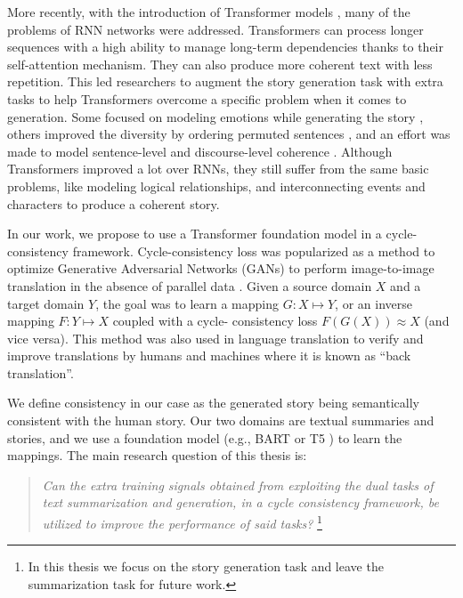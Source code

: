 More recently, with the introduction of Transformer models \citep{vaswani2017attention}, many of the problems of RNN networks were addressed. Transformers can process longer sequences with a high ability to manage long-term dependencies thanks to their self-attention mechanism. They can also produce more coherent text with less repetition. This led researchers to augment the story generation task with extra tasks to help Transformers overcome a specific problem when it comes to generation. Some focused on modeling emotions while generating the story \citep{brahman2020modeling, kong2021stylized}, others improved the diversity by ordering permuted sentences \citep{yu2021sentence}, and an effort was made to model sentence-level and discourse-level coherence \citep{guan2021long}. Although Transformers improved a lot over RNNs, they still suffer from the same basic problems, like modeling logical relationships, and interconnecting events and characters to produce a coherent story.

In our work, we propose to use a Transformer foundation model \citep{bommasani2021opportunities} in a cycle-consistency framework. Cycle-consistency loss was popularized as a method to optimize Generative Adversarial Networks (GANs) to perform image-to-image translation in the absence of parallel data \citep{zhu2017unpaired}. Given a source domain $X$ and a target domain $Y$, the goal was to learn a mapping $G \colon X \mapsto Y$, or an inverse mapping $F \colon Y \mapsto X$ coupled with a cycle-	consistency loss $F(G(X)) \approx X$ (and vice versa). This method was also used in language translation to verify and improve translations by humans \citep{brislin1970back} and machines \citep{he2016dual} where it is known as ``back translation''.

We define consistency in our case as the generated story being semantically consistent with the human story. Our two domains are textual summaries and stories, and we use a foundation model (e.g., BART \citep{lewis2019bart} or T5 \citep{raffel2019exploring}) to learn the mappings. The main research question of this thesis is:

\begin{quote}
\textit{Can the extra training signals obtained from exploiting the dual tasks of text summarization and generation, in a cycle consistency framework, be utilized to improve the performance of said tasks?} \footnote{In this thesis we focus on the story generation task and leave the summarization task for future work.}
\end{quote}

